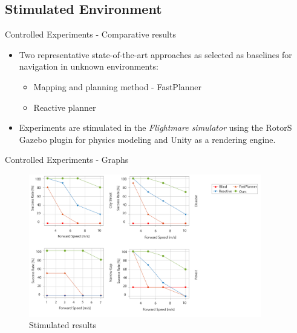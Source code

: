 \documentclass{beamer}
\begin{document}
\subsection{Stimulated Environment}
\begin{frame}{Controlled Experiments - Comparative results}
	\begin{itemize}
		\item Two representative state-of-the-art approaches as selected as baselines for navigation in unknown environments: 
		\begin{itemize}
			\item Mapping and planning method - FastPlanner
			\item Reactive planner
		\end{itemize}
	
		\item Experiments are stimulated in the \textit{Flightmare simulator} using the RotorS Gazebo plugin for physics modeling and Unity as a rendering engine.
		
	\end{itemize}
\end{frame}

\begin{frame}{Controlled Experiments - Graphs}
	\begin{figure}
		\includegraphics[width=4in]{images/controlled-experiments.png}
		\caption{Stimulated results}
	\end{figure}
	
\end{frame}
\end{document}
